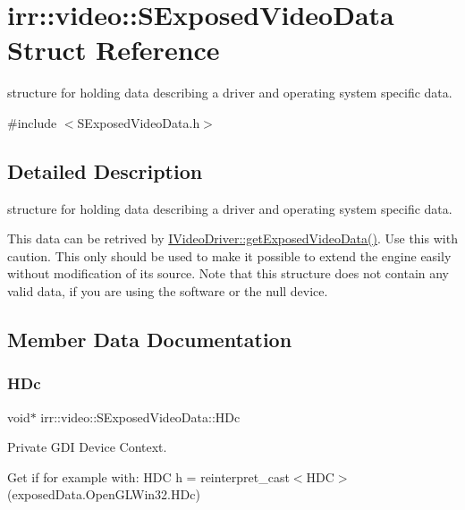 \hypertarget{structirr_1_1video_1_1SExposedVideoData}{}\section{irr\+:\+:video\+:\+:S\+Exposed\+Video\+Data Struct Reference}
\label{structirr_1_1video_1_1SExposedVideoData}


structure for holding data describing a driver and operating system specific data.  




{\ttfamily \#include $<$S\+Exposed\+Video\+Data.\+h$>$}



\subsection{Detailed Description}
structure for holding data describing a driver and operating system specific data. 

This data can be retrived by \hyperlink{classirr_1_1video_1_1IVideoDriver_a4f3535b2125e654e2e9645745e50cc49}{I\+Video\+Driver\+::get\+Exposed\+Video\+Data()}. Use this with caution. This only should be used to make it possible to extend the engine easily without modification of its source. Note that this structure does not contain any valid data, if you are using the software or the null device. 

\subsection{Member Data Documentation}
\mbox{\label{structirr_1_1video_1_1SExposedVideoData_ad7c4d919a8c0e17ee46577fcc69fe8e6}} 
\subsubsection{\texorpdfstring{H\+Dc}{HDc}}
{\footnotesize\ttfamily void$\ast$ irr\+::video\+::\+S\+Exposed\+Video\+Data\+::\+H\+Dc}



Private G\+DI Device Context. 

Get if for example with\+: H\+DC h = reinterpret\+\_\+cast$<$\+H\+D\+C$>$(exposed\+Data.\+Open\+G\+L\+Win32.\+H\+Dc) \mbox{\label{structirr_1_1video_1_1SExposedVideoData_a02e3cb39affd68c68e0d2e416f078e13}} 
